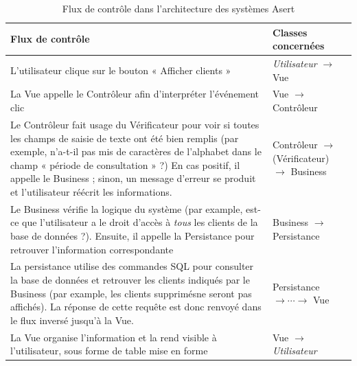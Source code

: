 \begin{table}[ht]
\begin{center}
    \begin{tabular}{ | p{8.5cm} | p{5cm} |}
    \hline
    \textbf{Flux de contrôle} & \textbf{Classes concernées} \\ \hline
    L'utilisateur clique sur le bouton « Afficher clients »  & \textit{Utilisateur} $\rightarrow$ Vue \\ \hline
    La Vue appelle le Contrôleur afin d'interpréter l'événement clic & Vue $\rightarrow$ Contrôleur \\ \hline
    Le Contrôleur fait usage du Vérificateur pour voir si toutes les champs de saisie de texte ont été bien remplis 
    	(par exemple, n'a-t-il pas mis de caractères de l'alphabet dans le champ « période de consultation » ?)
    	En cas positif, il appelle le Business ; sinon, un message d'erreur se produit et l'utilisateur réécrit les informations. 
    	& Contrôleur $\rightarrow$ (Vérificateur) $\rightarrow$ Business \\ \hline
    Le Business vérifie la logique du système (par example, est-ce que l'utilisateur a le droit d'accès à 
    \textit{tous} les clients de la base de données ?).
    	Ensuite, il appelle la Persistance pour retrouver l'information correspondante
    	& Business  $\rightarrow$ Persistance \\ \hline
    La persistance utilise des commandes SQL pour consulter la base de données et retrouver les clients indiqués par le Business 
    	(par example, les clients supprimés\footnotemark[1] ne seront pas affichés). 
    	La réponse de cette requête est donc renvoyé dans le flux inversé jusqu'à la Vue. 
    	& Persistance $\rightarrow \cdots \rightarrow$ Vue \\ \hline
    La Vue organise l'information et la rend visible à l'utilisateur, sous forme de table mise en forme 
    	& Vue $\rightarrow$ \textit{Utilisateur} \\
    \hline
    \end{tabular}
\end{center}
\caption{Flux de contrôle dans l'architecture des systèmes Asert}\label{flux}
\end{table}